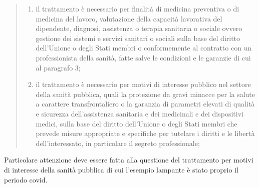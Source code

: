\begin{quote}
\begin{enumerate}
\begin{enumerate}[label=\alph*)]
                \item il trattamento è necessario per finalità di medicina preventiva o di medicina del lavoro, valutazione della capacità lavorativa del dipendente, diagnosi, assistenza o terapia sanitaria o sociale ovvero gestione dei sistemi e servizi sanitari o sociali sulla base del diritto dell'Unione o degli Stati membri o conformemente al contratto con un professionista della sanità, fatte salve le condizioni e le garanzie di cui al paragrafo 3;
                \item il trattamento è necessario per motivi di interesse pubblico nel settore della sanità pubblica, quali la protezione da gravi minacce per la salute a carattere transfrontaliero o la garanzia di parametri elevati di qualità e sicurezza dell'assistenza sanitaria e dei medicinali e dei dispositivi medici, sulla base del diritto dell'Unione o degli Stati membri che prevede misure appropriate e specifiche per tutelare i diritti e le libertà dell'interessato, in particolare il segreto professionale;
            \end{enumerate}
    \end{enumerate}
\end{quote}
Particolare attenzione deve essere fatta alla questione del trattamento per motivi di interesse della sanità pubblica di cui l'esempio lampante è stato proprio il periodo covid.
